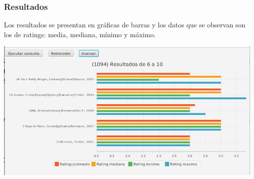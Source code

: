 \documentclass{beamer}
\begin{document}
\begin{frame}
\frametitle{Resultados}

Los resultados se presentan en gráficas de barras y los datos que se observan son los de ratings: media, mediana, mínimo y máximo.

\begin{center}
\includegraphics[scale=0.3]{barras}
\end{center}

\end{frame}
\end{document}
